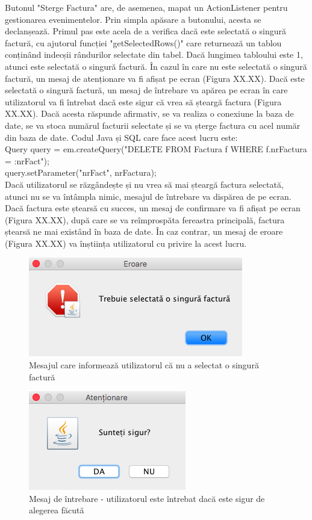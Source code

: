 \documentclass[12pt]{book}
\begin{document}
Butonul "Sterge Factura" are, de asemenea, mapat un ActionListener pentru gestionarea evenimentelor. Prin simpla apăsare a butonului, acesta se declanșează. Primul pas este acela de a verifica dacă este selectată o singură factură, cu ajutorul funcției "getSelectedRows()" care returnează un tablou conținând indecșii rândurilor selectate din tabel. Dacă lungimea tabloului este 1, atunci este selectată o singură factură. În cazul în care nu este selectată o singură factură, un mesaj de atenționare va fi afișat pe ecran (Figura XX.XX). Dacă este selectată o singură factură, un mesaj de întrebare va apărea pe ecran în care utilizatorul va fi întrebat dacă este sigur că vrea să șteargă factura (Figura XX.XX). Dacă acesta răspunde afirmativ, se va realiza o conexiune la baza de date, se va stoca numărul facturii selectate și se va șterge factura cu acel număr din baza de date. Codul Java și SQL care face acest lucru este:
\\
Query query = em.createQuery("DELETE FROM Factura f WHERE f.nrFactura = :nrFact");\\
query.setParameter("nrFact", nrFactura);\\

Dacă utilizatorul se răzgândește și nu vrea să mai șteargă factura selectată, atunci nu se va întâmpla nimic, mesajul de întrebare va dispărea de pe ecran. Dacă factura este ștearsă cu succes, un mesaj de confirmare va fi afișat pe ecran (Figura XX.XX), după care se va reîmprospăta fereastra principală, factura ștearsă ne mai existând în baza de date. În caz contrar, un mesaj de eroare (Figura XX.XX) va înștiința utilizatorul cu privire la acest lucru.

\begin{figure}[!ht]
	\centering
	\includegraphics{TrebuieSelectata1Factura}
	\caption{Mesajul care informează utilizatorul că nu a selectat o singură factură}
\end{figure}

\begin{figure}[!ht]
	\centering
	\includegraphics{SuntetiSigur}
	\caption{Mesaj de întrebare - utilizatorul este întrebat dacă este sigur de alegerea făcută}
\end{figure}
\end{document}
